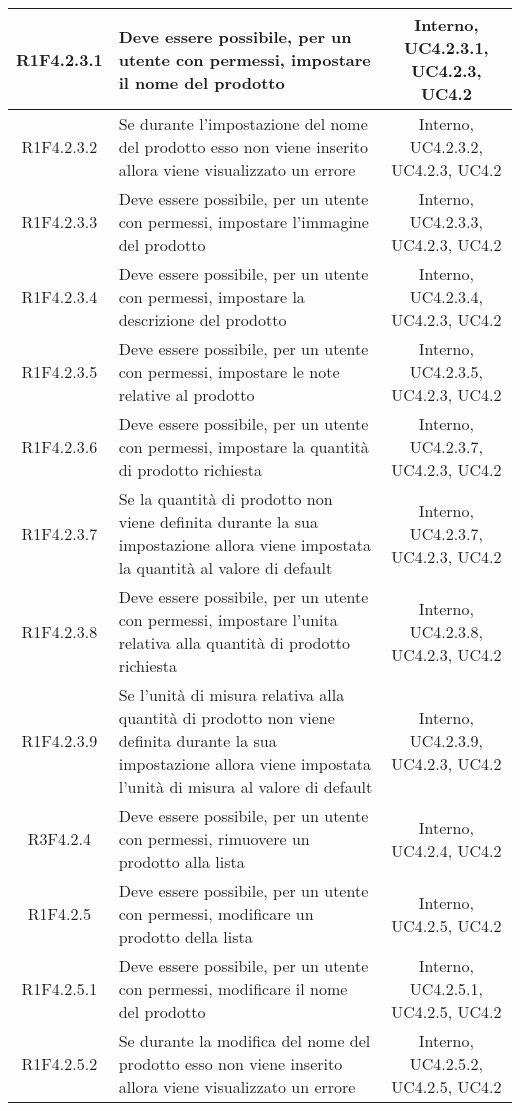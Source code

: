 \begin{longtable}{|c|>{\centering}m{7cm}|c|}
			\hline
			R1F4.2.3.1 & Deve essere possibile, per un utente con permessi, impostare il nome del prodotto & Interno, UC4.2.3.1, UC4.2.3, UC4.2 \\
			\hline
			R1F4.2.3.2 & Se durante l'impostazione del nome del prodotto esso non viene inserito allora viene visualizzato un errore & Interno, UC4.2.3.2, UC4.2.3, UC4.2 \\
			\hline
			R1F4.2.3.3 & Deve essere possibile, per un utente con permessi, impostare l'immagine del prodotto & Interno, UC4.2.3.3, UC4.2.3, UC4.2 \\
			\hline
			R1F4.2.3.4 & Deve essere possibile, per un utente con permessi, impostare la descrizione del prodotto & Interno, UC4.2.3.4, UC4.2.3, UC4.2 \\
			\hline
			R1F4.2.3.5 & Deve essere possibile, per un utente con permessi, impostare le note relative al prodotto & Interno, UC4.2.3.5, UC4.2.3, UC4.2 \\
			\hline
			R1F4.2.3.6 & Deve essere possibile, per un utente con permessi, impostare la quantità di prodotto richiesta & Interno, UC4.2.3.7, UC4.2.3, UC4.2 \\
			\hline
			R1F4.2.3.7 & Se la quantità di prodotto non viene definita durante la sua impostazione allora viene impostata la quantità al valore di default & Interno, UC4.2.3.7, UC4.2.3, UC4.2 \\
			\hline
			R1F4.2.3.8 & Deve essere possibile, per un utente con permessi, impostare l'unita relativa alla quantità di prodotto richiesta & Interno, UC4.2.3.8, UC4.2.3, UC4.2 \\
			\hline
			R1F4.2.3.9 & Se l'unità di misura relativa alla quantità di prodotto non viene definita durante la sua impostazione allora viene impostata l'unità di misura al valore di default & Interno, UC4.2.3.9, UC4.2.3, UC4.2 \\
			\hline
			R3F4.2.4 & Deve essere possibile, per un utente con permessi, rimuovere un prodotto alla lista & Interno, UC4.2.4, UC4.2 \\
			\hline
			R1F4.2.5 & Deve essere possibile, per un utente con permessi, modificare un prodotto della lista & Interno, UC4.2.5, UC4.2 \\
			\hline
			R1F4.2.5.1 & Deve essere possibile, per un utente con permessi, modificare il nome del prodotto & Interno, UC4.2.5.1, UC4.2.5, UC4.2 \\
			\hline
			R1F4.2.5.2 & Se durante la modifica del nome del prodotto esso non viene inserito allora viene visualizzato un errore & Interno, UC4.2.5.2, UC4.2.5, UC4.2 \\

\end{longtable}
